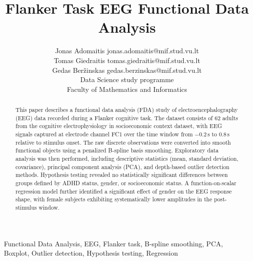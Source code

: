\documentclass[twoside,11pt]{article}
\begin{document}
\setlength{\parindent}{15pt}

\title{Flanker Task EEG Functional Data Analysis}

\author{\name Jonas Adomaitis \email jonas.adomaitis@mif.stud.vu.lt \\
  \name Tomas Giedraitis \email tomas.giedraitis@mif.stud.vu.lt \\
  \name Gedas Ber\v{z}inskas \email gedas.berzinskas@mif.stud.vu.lt \\
  \addr Data Science study programme \\
  Faculty of Mathematics and Informatics}


\maketitle

\begin{abstract}%
  This paper describes a functional data analysis (FDA) study of electroencephalography (EEG) data
  recorded during a Flanker cognitive task. The dataset consists of 62 adults from the cognitive
  electrophysiology in socioeconomic context dataset, with EEG signals captured at electrode channel
  FC1 over the time window from $-0.2\,\mathrm{s}$ to $0.8\,\mathrm{s}$ relative to stimulus onset.
  The raw discrete observations were converted into smooth functional objects using a penalized
  B-spline basis smoothing. Exploratory data analysis was then performed, including descriptive
  statistics (mean, standard deviation, covariance), principal component analysis (PCA), and
  depth-based outlier detection methods. Hypothesis testing revealed no statistically significant
  differences between groups defined by ADHD status, gender, or socioeconomic status. A
  function-on-scalar regression model further identified a significant effect of gender on the EEG
  response shape, with female subjects exhibiting systematically lower amplitudes in the
  post-stimulus window.
\end{abstract}

\begin{keywords}
  Functional Data Analysis, EEG, Flanker task, B-spline smoothing, PCA, Boxplot, Outlier detection,
  Hypothesis testing, Regression
\end{keywords}

\end{document}
